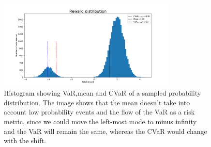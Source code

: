 \begin{figure}[ht]
    \centering
    \includegraphics[width=0.8\textwidth]{images/cvar_motivation2.pdf}
    \caption{Histogram showing VaR,mean and CVaR of a sampled probability distribution.
    The image shows that the mean doesn't take into account low probability events and 
    the flow of
    the VaR as a risk metric, since we could move the left-most mode to minus infinity
    and the VaR will remain the same, whereas the CVaR would change with the shift. }
    \label{cvar_motivation}

\end{figure}

